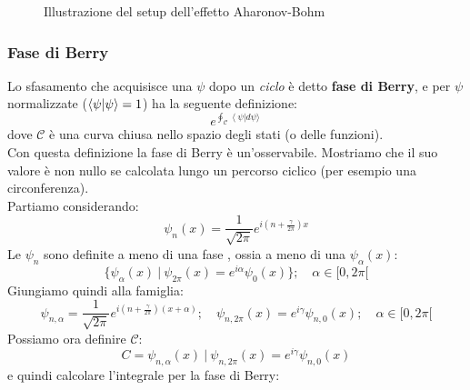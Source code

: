 \documentclass[../../FisicaTeorica.tex]{subfiles}
\begin{document}
\begin{figure}

    \caption{Illustrazione del setup dell'effetto Aharonov-Bohm}
    \label{fig:aharonov_bohm}
\end{figure}%

\subsubsection{Fase di Berry}
Lo sfasamento che acquisisce una $\psi$ dopo un \textit{ciclo} è detto \textbf{fase di Berry}, e per $\psi$ normalizzate ($\braket{\psi|\psi} = 1$) ha la seguente definizione:
\[
e^{\oint_{\mathcal{C}}{\left\langle\psi\right|d\psi\rangle\ }}
\]
dove $\mathcal{C}$ è una curva chiusa nello spazio degli stati (o delle funzioni).\\
Con questa definizione la fase di Berry è un'osservabile. Mostriamo che il suo valore è non nullo se calcolata lungo un percorso ciclico (per esempio una circonferenza).\\
Partiamo considerando:
\[
\psi_n\left(x\right)=\frac{1}{\sqrt{2\pi}}e^{i\left(n+\frac{\gamma}{2\pi}\right)x}
\]
Le $\psi_n$ sono definite a meno di una fase , ossia a meno di una $\psi_\alpha(x)$:
\[
\{\psi_\alpha(x)\>|\>\psi_{2\pi}(x) = e^{i\alpha} \psi_0(x)\}; \quad \alpha \in [0,2\pi[
\]
Giungiamo quindi alla famiglia:
\[
\psi_{n,\alpha}=\frac{1}{\sqrt{2\pi}}e^{i\left(n+\frac{\gamma}{2\pi}\right)\left(x+\alpha\right)}; \quad \psi_{n,2\pi}(x) = e^{i\gamma}\psi_{n,0}(x); \quad \alpha \in [0,2\pi [
\]
Possiamo ora definire $\mathcal{C}$:
\[
C=\psi_{n,\alpha}\left(x\right)\>|\>  \psi_{n,2\pi}\left(x\right)=e^{i\gamma}\psi_{n,0}(x)
\]
e quindi calcolare l'integrale per la fase di Berry:
\end{document}

